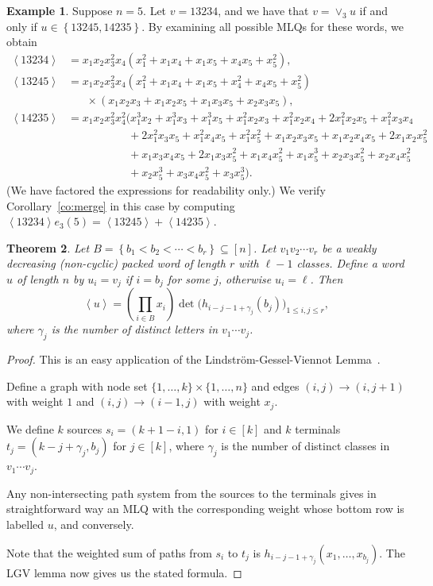 \documentclass[reqno]{amsart}
\newcommand{\0}{\phantom{c}}
\newcommand{\swt}[1]{\left\langle #1 \right\rangle} %
\newcommand{\merge}[1]{\vee_{#1}} %
\let\prodnonlimits\prod
\renewcommand{\prod}{\prodnonlimits\limits}
\newcommand{\set}[1]{\left\{ #1 \right\}}
\newcommand{\ive}[1]{\left[ #1 \right]}
\theoremstyle{plain}
\newtheorem{thm}{Theorem}[section]
\theoremstyle{definition}
\newtheorem{example}[thm]{Example}
\numberwithin{equation}{section}
\begin{document}
\begin{example}
Suppose $n = 5$.
Let $v = 13234$, and we have that $v = \merge{3} u$ if and only if $u \in \set{13245, 14235}$.
By examining all possible MLQs for these words, we obtain
\begin{align*}
\swt{13234} & = x_1 x_2 x_3^2 x_4 (x_1^2 + x_1 x_4 + x_1 x_5 + x_4 x_5 + x_5^2),
\\ \swt{13245} & = x_1 x_2 x_3^2 x_4 (x_1^2 + x_1x_4 + x_1x_5 + x_4^2 + x_4x_5 + x_5^2)
\\ & \hspace{20pt} \times (x_1x_2x_3 + x_1x_2x_5+x_1x_3x_5+x_2x_3x_5),
\\ \swt{14235} & = x_1x_2x_3^2x_4^2 (x_1^3x_2 + x_1^3x_3 + x_1^3x_5 + x_1^2x_2x_3 + x_1^2x_2x_4 + 2x_1^2x_2x_5 + x_1^2x_3x_4
\\ & \hspace{65pt} + 2x_1^2x_3x_5 + x_1^2x_4x_5 + x_1^2x_5^2 + x_1x_2x_3x_5 + x_1x_2x_4x_5 + 2x_1x_2x_5^2
\\ & \hspace{65pt} + x_1x_3x_4x_5 + 2x_1x_3x_5^2 + x_1x_4x_5^2 + x_1x_5^3 + x_2x_3x_5^2 + x_2x_4x_5^2
\\ & \hspace{65pt} + x_2x_5^3 + x_3x_4x_5^2 + x_3x_5^3).
\end{align*}
(We have factored the expressions for readability only.)
We verify Corollary~\ref{co:merge} in this case by computing $\swt{13234} e_3(5) = \swt{13245} + \swt{14235}$.
\end{example}


\begin{thm}
\label{thm:determinant_form}
  Let $B = \set{b_1 < b_2 < \cdots < b_r} \subseteq \ive{n}$.
  Let $v_1v_2 \dotsm v_r$ be a weakly decreasing (non-cyclic) packed word of length $r$ with $\ell-1$ classes.
  Define a word $u$ of length $n$ by $u_i = v_j$ if $i = b_j$ for some $j$, otherwise $u_i = \ell$.
  Then
  \[
  \swt{u} = \left( \prod_{i\in B} x_i \right) \det\bigl( h_{i-j-1+\gamma_j}(b_j) \bigr)_{1\leq i,j\leq r},
  \]
  where $\gamma_j$ is the number of distinct letters in $v_1 \dotsm v_j$.
\end{thm}

\begin{proof}
This is an easy application of the Lindstr\"om-Gessel-Viennot Lemma~\cite{Lindstrom73,GV85}.

Define a graph with node set $\{1,\dotsc,k\} \times \{1, \dotsc, n\}$ and edges $(i,j) \to (i,j+1)$ with weight $1$ and $(i,j) \to (i-1,j)$ with weight $x_j$. 

We define $k$ sources $s_i = (k+1-i, 1)$ for $i\in[k]$ and $k$ terminals $t_j = (k-j+\gamma_j,b_j)$ for $j\in[k]$, where $\gamma_j$ is the number of distinct classes in $v_1\dotsm v_j$.

Any non-intersecting path system from the sources to the terminals gives in straightforward way an MLQ with the corresponding weight whose bottom row is labelled $u$, and conversely.

Note that the weighted sum of paths from $s_i$ to $t_j$ is $h_{i-j-1+\gamma_j}(x_1,\dots,x_{b_j})$. The LGV lemma now gives us the stated formula.
\end{proof}
\end{document}
